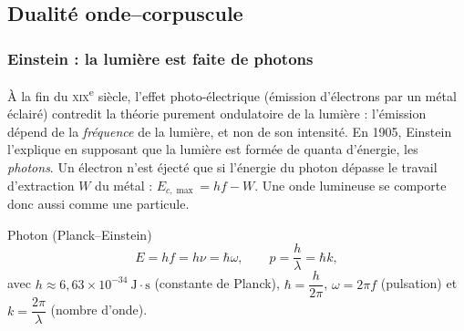 \subsection{Dualité onde--corpuscule}\label{sec:dualite}

\subsubsection{Einstein : la lumière est faite de photons}

À la fin du \textsc{xix}\textsuperscript{e} siècle, l'effet photo-électrique
(émission d'électrons par un métal éclairé) contredit la théorie purement
ondulatoire de la lumière : l'émission dépend de la \emph{fréquence} de la
lumière, et non de son intensité. En 1905, Einstein l'explique en supposant que
la lumière est formée de quanta d'énergie, les \emph{photons}. Un électron n'est
éjecté que si l'énergie du photon dépasse le travail d'extraction $W$ du métal :
$E_{c,\max} = hf - W$. Une onde lumineuse se comporte donc aussi comme une
particule.

\begin{definition}{Photon (Planck--Einstein)}
\[
  E = hf = h\nu = \hbar\omega ,
  \qquad
  p = \frac{h}{\lambda} = \hbar k ,
\]
avec $h \approx 6{,}63\times10^{-34}\ \mathrm{J\cdot s}$ (constante de Planck),
$\hbar = \dfrac{h}{2\pi}$, $\omega = 2\pi f$ (pulsation) et
$k = \dfrac{2\pi}{\lambda}$ (nombre d'onde).
\end{definition}

